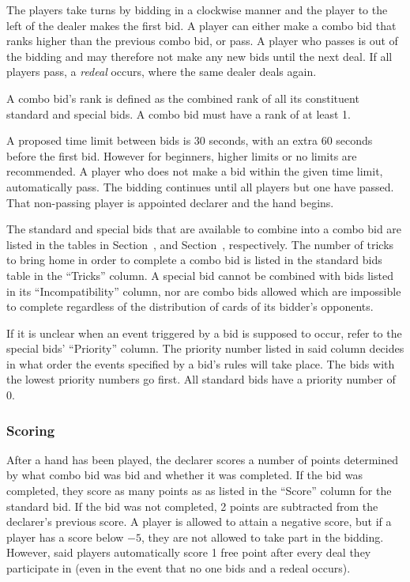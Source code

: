 \documentclass[a4paper]{article}
\begin{document}
	The players take turns by bidding in a clockwise manner and the player to the left of the dealer makes the first bid. A player can either make a combo bid that ranks higher than the previous combo bid, or pass. A player who passes is out of the bidding and may therefore not make any new bids until the next deal. If all players pass, a \emph{redeal} occurs, where the same dealer deals again.

	A combo bid's rank is defined as the combined rank of all its constituent standard and special bids. A combo bid must have a rank of at least 1.

	A proposed time limit between bids is 30 seconds, with an extra 60 seconds before the first bid. However for beginners, higher limits or no limits are recommended. A player who does not make a bid within the given time limit, automatically pass. The bidding continues until all players but one have passed. That non-passing player is appointed declarer and the hand begins.

	The standard and special bids that are available to combine into a combo bid are listed in the tables in Section~, and Section~, respectively. The number of tricks to bring home in order to complete a combo bid is listed in the standard bids table in the ``Tricks'' column. A special bid cannot be combined with bids listed in its ``Incompatibility'' column, nor are combo bids allowed which are impossible to complete regardless of the distribution of cards of its bidder's opponents.

	If it is unclear when an event triggered by a bid is supposed to occur, refer to the special bids' ``Priority'' column. The priority number listed in said column decides in what order the events specified by a bid's rules will take place. The bids with the lowest priority numbers go first. All standard bids have a priority number of 0.

	\subsubsection{Scoring}
	After a hand has been played, the declarer scores a number of points determined by what combo bid was bid and whether it was completed. If the bid was completed, they score as many points as as listed in the ``Score'' column for the standard bid. If the bid was not completed, 2 points are subtracted from the declarer's previous score. A player is allowed to attain a negative score, but if a player has a score below $-5$, they are not allowed to take part in the bidding. However, said players automatically score 1 free point after every deal they participate in (even in the event that no one bids and a redeal occurs).
\end{document}
